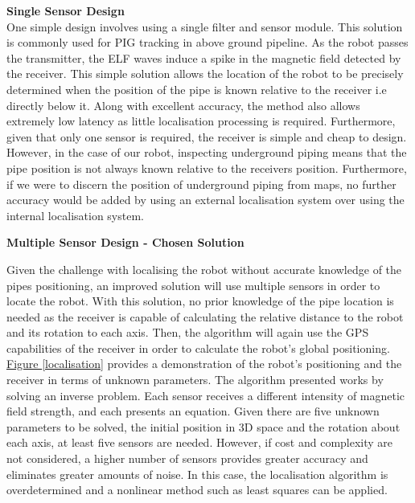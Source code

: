 \documentclass[11pt]{article}		%
\newcommand{\figref}[1]{\hyperref[#1]{Figure \ref*{#1}}}    %
\begin{document}
			\textbf{Single Sensor Design}\\
			One simple design involves using a single filter and sensor module. This solution is commonly used for PIG tracking in above ground pipeline. As the robot passes the transmitter, the ELF waves induce a spike in the magnetic field detected by the receiver. This simple solution allows the location of the robot to be precisely determined when the position of the pipe is known relative to the receiver i.e directly below it. Along with excellent accuracy, the method also allows extremely low latency as little localisation processing is required. Furthermore, given that only one sensor is required, the receiver is simple and cheap to design. \\
	    	\hspace*{3ex}However, in the case of our robot, inspecting underground piping means that the pipe position is not always known relative to the receivers position. Furthermore, if we were to discern the position of underground piping from maps, no further accuracy would be added by using an external localisation system over using the internal localisation system. 
	
	        \textbf{Multiple Sensor Design - Chosen Solution}
			
		    Given the challenge with localising the robot without accurate knowledge of the pipes positioning, an improved solution will use multiple sensors in order to locate the robot. With this solution, no prior knowledge of the pipe location is needed as the receiver is capable of calculating the relative distance to the robot and its rotation to each axis. Then, the algorithm will again use the GPS capabilities of the receiver in order to calculate the robot's global positioning. \\
			
			\hspace*{3ex} \figref{localisation} provides a demonstration of the robot's positioning and the receiver in terms of unknown parameters. The algorithm presented works by solving an inverse problem. Each sensor receives a different intensity of magnetic field strength, and each presents an equation. Given there are five unknown parameters to be solved, the initial position in 3D space and the rotation about each axis, at least five sensors are needed. However, if cost and complexity are not considered, a higher number of sensors provides greater accuracy and eliminates greater amounts of noise. In this case, the localisation algorithm is overdetermined and a nonlinear method such as least squares can be applied. \\
			
\end{document}
